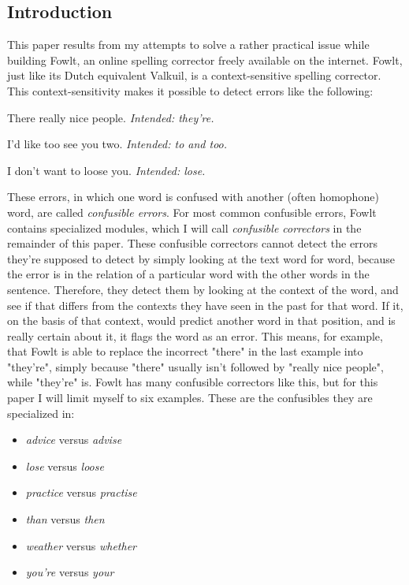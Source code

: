 \documentclass[12pt]{article}
\begin{document}
\subsection{Introduction}

This paper results from my attempts to solve a rather practical issue while building Fowlt, an online spelling corrector freely available on the internet. Fowlt, just like its Dutch equivalent Valkuil, is a context-sensitive spelling corrector. This context-sensitivity makes it possible to detect errors like the following:

\begin{examples}

\item There really nice people. \emph{Intended: they're.}
\item I'd like too see you two. \emph{Intended: to and too.}
\item I don't want to loose you. \emph{Intended: lose.}

\end{examples}

These errors, in which one word is confused with another (often homophone) word, are called \emph{confusible errors}. For most common confusible errors, Fowlt contains specialized modules, which I will call \emph{confusible correctors} in the remainder of this paper. These confusible correctors cannot detect the errors they're supposed to detect by simply looking at the text word for word, because the error is in the relation of a particular word with the other words in the sentence. Therefore, they detect them by looking at the context of the word, and see if that differs from the contexts they have seen in the past for that word. If it, on the basis of that context, would predict another word in that position, and is really certain about it, it flags the word as an error. This means, for example, that Fowlt is able to replace the incorrect "there" in the last example into "they're", simply because "there" usually isn't followed by "really nice people", while "they're" is. Fowlt has many confusible correctors like this, but for this paper I will limit myself to six examples. These are the confusibles they are specialized in: 

\begin{itemize}
\item \emph{advice} versus \emph{advise}
\item \emph{lose} versus \emph{loose}
\item \emph{practice} versus \emph{practise}
\item \emph{than} versus \emph{then}
\item \emph{weather} versus \emph{whether}
\item \emph{you're} versus \emph{your}
\end{itemize}
\end{document}
